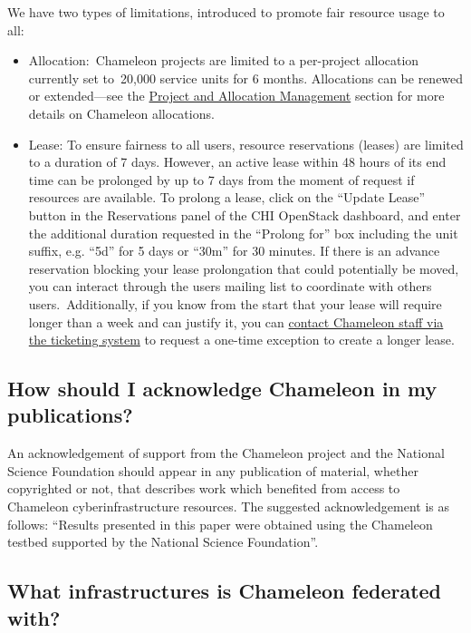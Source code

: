 We have two types of limitations, introduced to promote fair resource
usage to all:~

\begin{itemize}

\item
  Allocation:~Chameleon projects are limited to a per-project allocation
  currently set to~20,000 service units for 6 months. Allocations can be
  renewed or extended---see the
  \href{index.html\#toc-project-and-allocation-management}{Project and
  Allocation Management} section for more details on Chameleon
  allocations.
\item
  Lease: To ensure fairness to all users, resource reservations (leases)
  are limited to a duration of 7 days. However, an active lease within
  48 hours of its end time can be prolonged by up to 7 days from the
  moment of request if resources are available. To prolong a lease,
  click on the ``Update Lease'' button in the Reservations panel of the
  CHI OpenStack dashboard, and enter the additional duration requested
  in the ``Prolong for'' box including the unit suffix, e.g. ``5d'' for
  5 days or ``30m'' for 30 minutes. If there is an advance reservation
  blocking your lease prolongation that could potentially be moved, you
  can interact through the users mailing list to coordinate with others
  users.~Additionally, if you know from the start that your lease will
  require longer than a week and can justify it, you can
  \href{https://www.chameleoncloud.org/user/help/ticket/new/}{contact
  Chameleon staff via the ticketing system} to request a one-time
  exception to create a longer lease.
\end{itemize}

\subsection{How should I acknowledge Chameleon in my
publications?}\label{how-should-i-acknowledge-chameleon-in-my-publications}

An acknowledgement of support from the Chameleon project and the
National Science Foundation should appear in any publication of
material, whether copyrighted or not, that describes work which
benefited from access to Chameleon cyberinfrastructure resources. The
suggested acknowledgement is as follows: ``Results presented in this
paper were obtained using the Chameleon testbed supported by the
National Science Foundation''.

\subsection{What infrastructures is Chameleon federated
with?}\label{what-infrastructures-is-chameleon-federated-with}

